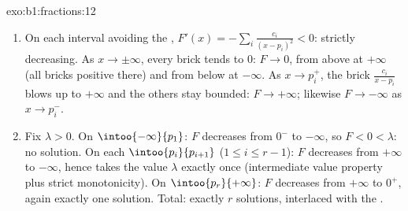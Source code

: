 \begin{solution}{exo:b1:fractions:12}
\begin{enumerate}
  \item On each interval avoiding the , $F'(x) = -\sum_i
        \frac{c_i}{(x - p_i)^2} < 0$: strictly decreasing. As $x
        \to \pm\infty$, every brick tends to $0$: $F \to 0$, from
        above at $+\infty$ (all bricks positive there) and from
        below at $-\infty$. As $x \to p_i^+$, the brick
        $\frac{c_i}{x - p_i}$ blows up to $+\infty$ and the others
        stay bounded: $F \to +\infty$; likewise $F \to -\infty$ as
        $x \to p_i^-$.
  \item Fix $\lambda > 0$. On $\intoo{-\infty}{p_1}$: $F$
        decreases from $0^-$ to $-\infty$, so $F < 0 < \lambda$:
        no solution. On each $\intoo{p_i}{p_{i+1}}$ ($1 \leq i
        \leq r-1$): $F$ decreases from $+\infty$ to $-\infty$,
        hence takes the value $\lambda$ exactly once (intermediate
        value property plus strict monotonicity). On
        $\intoo{p_r}{+\infty}$: $F$ decreases from $+\infty$ to
        $0^+$, again exactly one solution. Total: exactly $r$
        solutions, interlaced with the .
\end{enumerate}
\end{solution}

